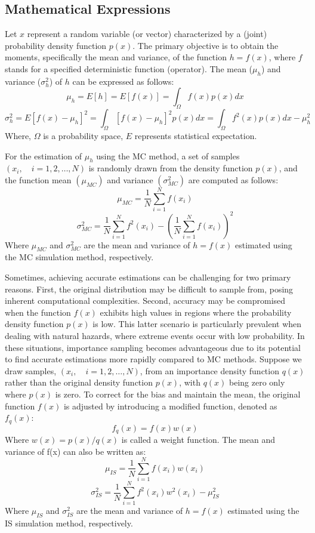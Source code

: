     \subsection{Mathematical Expressions}
        Let $x$ represent a random variable (or vector) characterized by a (joint) probability density function $p(x)$. The primary objective is to obtain the moments, specifically the mean and variance, of the function $h = f(x)$, where $f$ stands for a specified deterministic function (operator). The mean ($\mu_h$) and variance ($\sigma_h^2$) of $h$ can be expressed as follows:
        $$\mu_h=E[h]=E[f(x)]=\int_\Omega f(x)p(x)dx$$
        $$\sigma_h^2=E{[f(x)-\mu_h]^2}=\int_\Omega[f(x)-\mu_h]^2 p(x)dx = \int_\Omega f^2(x)p(x)dx-\mu^2_h$$
        Where, $\Omega$ is a probability space, $E$ represents statistical expectation.
        
        For the estimation of $\mu_h$ using the MC method, a set of samples $(x_i,\quad i=1,2,…,N)$ is randomly drawn from the density function $p(x)$, and the function mean $(\mu_{MC})$ and variance $(\sigma_{MC}^2)$ are computed as follows:
        $$\mu_{MC}=\frac{1}{N}\sum_{i=1}^{N} f(x_i)$$
        $$\sigma_{MC}^2=\frac{1}{N}\sum_{i=1}^{N}f^2(x_i)-(\frac{1}{N}\sum_{i=1}^{N} f(x_i))^2$$
        Where $\mu_{MC}$ and $\sigma_{MC}^2$ are the mean and variance of $h=f(x)$ estimated using the MC simulation method, respectively.
        
        Sometimes, achieving accurate estimations can be challenging for two primary reasons. First, the original distribution may be difficult to sample from, posing inherent computational complexities. Second, accuracy may be compromised when the function $f(x)$ exhibits high values in regions where the probability density function $p(x)$ is low. This latter scenario is particularly prevalent when dealing with natural hazards, where extreme events occur with low probability. In these situations, importance sampling becomes advantageous due to its potential to find accurate estimations more rapidly compared to MC methods. Suppose we draw samples, $(x_i, \quad i=1,2,…,N)$, from an importance density function $q(x)$ rather than the original density function $p(x)$, with $q(x)$ being zero only where $p(x)$ is zero. To correct for the bias and maintain the mean, the original function $f(x)$ is adjusted by introducing a modified function, denoted as $f_q(x)$:
        $$f_q(x)=f(x) w(x)$$
        Where $w(x)=p(x)/q(x)$ is called a weight function. 
        The mean and variance of f(x) can also be written as:
        $$\mu_{IS}=\frac{1}{N} \sum_{i=1}^{N}f(x_i)w(x_i)$$
        $$\sigma_{IS}^2=\frac{1}{N} \sum_{i=1}^N f^2(x_i)w^2(x_i)-\mu_{IS}^2$$
        Where $\mu_{IS}$ and $\sigma_{IS}^2$ are the mean and variance of $h=f(x)$ estimated using the IS simulation method, respectively. 
        
